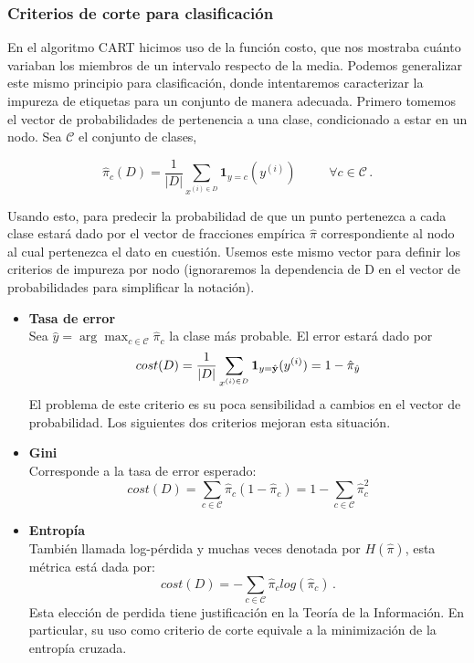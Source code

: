 \subsubsection{Criterios de corte para clasificación}

En el algoritmo CART hicimos uso de la función costo, que nos mostraba cuánto variaban los miembros de un intervalo respecto de la media. Podemos generalizar este mismo principio para clasificación, donde intentaremos caracterizar la impureza de etiquetas para un conjunto de manera adecuada. Primero tomemos el vector de probabilidades de pertenencia a una clase, condicionado a estar en un nodo. Sea $\mathcal{C}$ el conjunto de clases,

\begin{equation}
    \hat \pi_c (D) = \frac{1}{|D|} \sum_{x^{(i) \in D}} \mathbf{1}_{y=c}(y^{(i)}) \hspace{1cm} \, \forall c \in \mathcal{C} \,.
\end{equation}

Usando esto, para predecir la probabilidad de que un punto pertenezca a cada clase estará dado por el vector de fracciones empírica $\hat \pi$ correspondiente al nodo al cual pertenezca el dato en cuestión. Usemos este mismo vector para definir los criterios de impureza por nodo (ignoraremos la dependencia de D en el vector de probabilidades para simplificar la notación).

\begin{itemize}
    \item \textbf{Tasa de error} \\
    Sea $\hat y = \arg\max_{c \in \mathcal{C}} \hat \pi_c$ la clase más probable. El error estará dado por
    \begin{equation}
        cost(D) = \frac{1}{|D|} \sum_{x^{(i) \in D}} \mathbf{1}_{y = \hat {\mathbf{y}}}(y^{(i)}) = 1 - \hat \pi_{\hat y}
    \end{equation}
    El problema de este criterio es su poca sensibilidad a cambios en el vector de probabilidad. Los siguientes dos criterios mejoran esta situación.

    \item \textbf{Gini} \\
    Corresponde a la tasa de error esperado:
    \begin{equation}
        cost(D) = \sum_{c \in \mathcal{C}} \hat \pi_c (1 - \hat \pi_c) = 1 - \sum_{c \in \mathcal{C}} \hat \pi_c^2
    \end{equation}

    \item \textbf{Entropía} \\
    También llamada log-pérdida y muchas veces denotada por $H(\hat \pi)$, esta métrica está dada por:
    \begin{equation}
        cost(D) = - \sum_{c \in \mathcal{C}} \hat \pi_c log(\hat \pi_c) \,.
    \end{equation}
    Esta elección de perdida tiene justificación en la Teoría de la Información. En particular, su uso como criterio de corte equivale a la minimización de la entropía cruzada.
\end{itemize}

